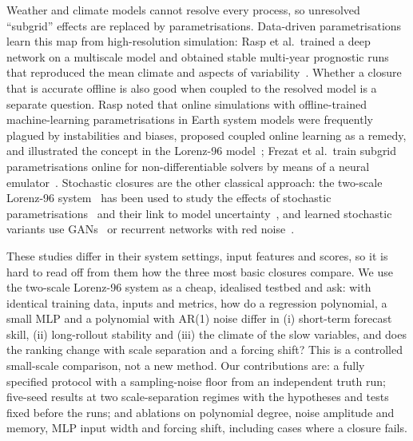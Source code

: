 Weather and climate models cannot resolve every process, so unresolved ``subgrid'' effects are replaced by parametrisations. Data-driven parametrisations learn this map from high-resolution simulation: Rasp et al.\ trained a deep network on a multiscale model and obtained stable multi-year prognostic runs that reproduced the mean climate and aspects of variability~\cite{rasp2018deep}. Whether a closure that is accurate offline is also good when coupled to the resolved model is a separate question. Rasp noted that online simulations with offline-trained machine-learning parametrisations in Earth system models were frequently plagued by instabilities and biases, proposed coupled online learning as a remedy, and illustrated the concept in the Lorenz-96 model~\cite{rasp2019coupled}; Frezat et al.\ train subgrid parametrisations online for non-differentiable solvers by means of a neural emulator~\cite{frezat2023gradient}. Stochastic closures are the other classical approach: the two-scale Lorenz-96 system~\cite{lorenz2006predictability} has been used to study the effects of stochastic parametrisations~\cite{wilks2005effects} and their link to model uncertainty~\cite{arnold2013stochastic}, and learned stochastic variants use GANs~\cite{gagne2019machine} or recurrent networks with red noise~\cite{parthipan2022using}.

These studies differ in their system settings, input features and scores, so it is hard to read off from them how the three most basic closures compare. We use the two-scale Lorenz-96 system as a cheap, idealised testbed and ask: with identical training data, inputs and metrics, how do a regression polynomial, a small MLP and a polynomial with AR(1) noise differ in (i) short-term forecast skill, (ii) long-rollout stability and (iii) the climate of the slow variables, and does the ranking change with scale separation and a forcing shift? This is a controlled small-scale comparison, not a new method. Our contributions are: a fully specified protocol with a sampling-noise floor from an independent truth run; five-seed results at two scale-separation regimes with the hypotheses and tests fixed before the runs; and ablations on polynomial degree, noise amplitude and memory, MLP input width and forcing shift, including cases where a closure fails.
